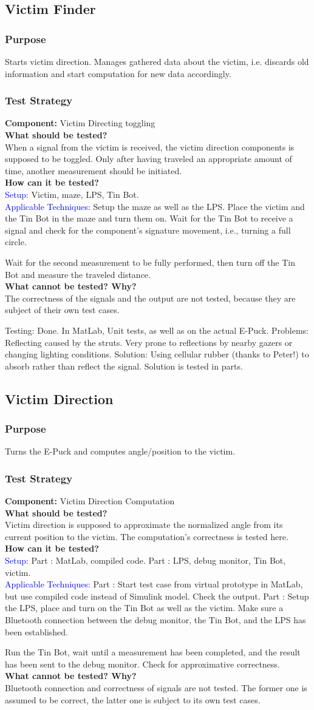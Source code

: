\documentclass[a4paper,parskip,headheight=38pt]{scrartcl} %
\newcommand*{\rom}[1]{\uppercase\expandafter{\romannumeral #1\relax}}
\newcommand{\teststrat}[5]{
    \subsubsection{Test Strategy}
	\textbf{Component:} #1 \\
	\noindent\textbf{What should be tested?} \\
    \noindent #2 \\
	\noindent\textbf{How can it be tested?} \\
    \noindent\textcolor{blue}{Setup:} #3 \\
    \noindent\textcolor{blue}{Applicable Techniques:} #4 \\
	\noindent\textbf{What cannot be tested? Why?} \\
    \noindent #5
}
\newcommand{\ie}{i.e.}
\begin{document}
\subsection{Victim Finder}
\subsubsection{Purpose}
Starts victim direction. Manages gathered data about the victim, i.e. discards old information and start computation for new data accordingly.

\teststrat{Victim Directing toggling}{
    When a signal from the victim is received, the victim direction components
    is supposed to be toggled. Only after having traveled an appropriate amount
    of time, another measurement should be initiated.
}{
    Victim, maze, LPS, Tin Bot.
}{
    Setup the maze as well as the LPS. Place the victim and the
    Tin Bot in the
    maze and turn them on. Wait for the Tin Bot to receive a signal and check
    for the component's signature movement, \ie, turning a full circle.

    Wait for the second measurement to be fully performed, then turn off the Tin
    Bot and measure the traveled distance.
}{
    The correctness of the signals and the output are not tested, because they
    are subject of their own test cases.
}
Testing: Done. In MatLab, Unit tests, as well as on the actual E-Puck. Problems: Reflecting caused by the struts. Very prone to reflections by nearby gazers or changing lighting conditions. Solution: Using cellular rubber (thanks to Peter!) to absorb rather than reflect the signal. Solution is tested in parts.

\subsection{Victim Direction}
\subsubsection{Purpose}
Turns the E-Puck and computes angle/position to the victim.
\teststrat{Victim Direction Computation}{
    Victim direction is supposed to approximate the normalized angle from its
    current position to the victim. The computation's correctness is tested
    here.
}{
    Part \rom{1}: MatLab, compiled code.
    Part \rom{2}: LPS, debug monitor, Tin Bot, victim.
}{
    Part \rom{1}: Start test case from virtual prototype in MatLab, but use
    compiled code
    instead of Simulink model. Check the output.
    Part \rom{2}: Setup the LPS, place and turn on the Tin Bot as well as the
    victim. Make sure a Bluetooth connection between the debug monitor, the Tin
    Bot, and the LPS has been established. 

    Run the Tin Bot, wait until a measurement has been completed, and the result
    has been sent to the debug monitor. Check for approximative correctness.
}{
    Bluetooth connection and correctness of signals are not tested. The former
    one is assumed to be correct, the latter one is subject to its own test
    cases.
}
\end{document}
